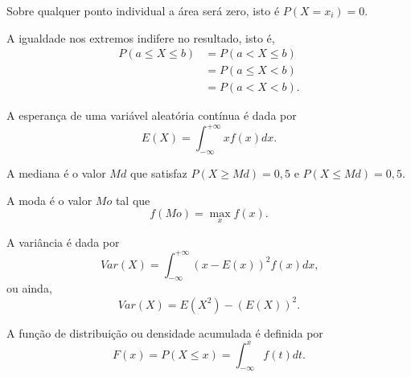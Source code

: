 \documentclass[11pt,fleqn]{book}
\numberwithin{mpicture}{chapter}
\numberwithin{mtable}{chapter}
\numberwithin{mframe}{chapter}
\begin{document}
\begin{remark}
	Sobre qualquer ponto individual a área será zero, isto é $P(X=x_i)=0$.
\end{remark}

\begin{remark}
	A igualdade nos extremos indifere no resultado, isto é,
	\begin{align*}
		P(a\leqslant X \leqslant b) &= P(a < X \leqslant b)\\
							  		 &=P(a\leqslant X < b)\\
									 &=P(a<X<b)\text{.}
	\end{align*}
\end{remark}

\begin{definition}
	A esperança de uma variável aleatória contínua é dada por
	\begin{equation}
		E(X)=\int_{-\infty}^{+\infty} xf(x)dx
		\text{.}
	\end{equation}
\end{definition}

\begin{definition}
	A mediana é o valor $Md$ que satisfaz $P(X\geqslant Md)=0,5$ e $P(X\leqslant Md)=0,5$.
\end{definition}

\begin{definition}
	A moda é o valor $Mo$ tal que
	\begin{equation}
		f(Mo)=\max_x f(x)
		\text{.}
	\end{equation}
\end{definition}

\begin{definition}
	A variância é dada por
	\begin{equation}
		Var(X)=\int_{-\infty}^{+\infty} (x-E(x))^2 f(x) dx
		\text{,}
	\end{equation}
	ou ainda,
	\begin{equation}
		Var(X)=E(X^2)-(E(X))^2
		\text{.}
	\end{equation}
\end{definition}

\begin{definition}
	A função de distribuição ou densidade acumulada é definida por
	\begin{equation}
		F(x)=P(X\leqslant x)=\int_{-\infty}^{x} f(t)dt
		\text{.}
	\end{equation}
\end{definition}
\end{document}
